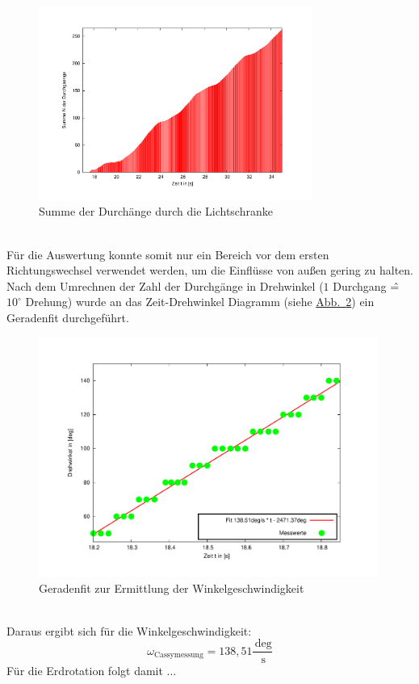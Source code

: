 \documentclass[11pt]{scrartcl}
\newcommand{\unit}[1]{\ensuremath{\,\mathrm{#1}}} %
\begin{document}
\begin{figure}[ht]
\begin{center}
\includegraphics[width=0.8\textwidth]{images/durchg29-cassy.pdf}
\end{center}
\vspace{-1.5\baselineskip}
\caption{Summe der Durch\"ange durch die Lichtschranke}
\label{durchg29-cassy}
\end{figure}
\\F\"ur die Auswertung konnte somit nur ein Bereich vor dem ersten Richtungswechsel verwendet werden, um die Einfl\"usse von au\ss{}en gering zu halten. Nach dem Umrechnen der Zahl der Durchg\"ange in Drehwinkel ($1$ Durchgang \^{=} $10^\circ$ Drehung) wurde an das \glqq Zeit-Drehwinkel\grqq{} Diagramm (siehe \hyperref[zeit-winkel29-cassy]{Abb.~\ref{zeit-winkel29-cassy}}) ein Geradenfit durchgef\"uhrt.
\begin{figure}[ht]
\begin{center}
\includegraphics[width=0.99\textwidth]{images/zeit-winkel29-cassy.pdf}
\end{center}
\vspace{-1.5\baselineskip}
\caption{Geradenfit zur Ermittlung der Winkelgeschwindigkeit}
\label{zeit-winkel29-cassy}
\end{figure}
\\Daraus ergibt sich f\"ur die Winkelgeschwindigkeit:
\[ \omega_{\text{Cassymessung}} = 138,51 \frac{\unit{deg}}{\unit{s}} \]
F\"ur die Erdrotation folgt damit ...
\end{document}
